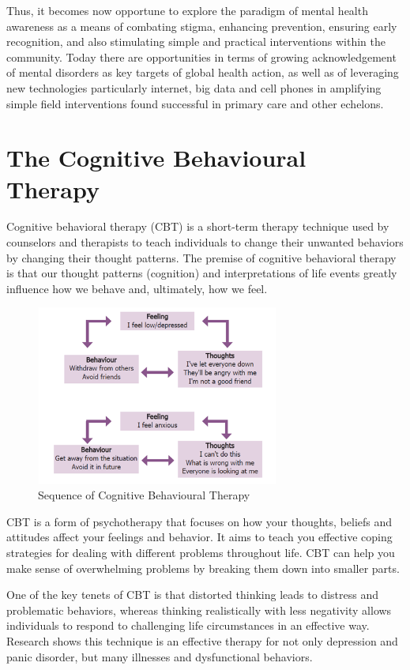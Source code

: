 Thus, it becomes now opportune to explore the paradigm of mental health awareness as a means of combating stigma, enhancing prevention, ensuring early recognition, and also stimulating simple and practical interventions within the community. Today there are opportunities in terms of growing acknowledgement of mental disorders as key targets of global health action, as well as of leveraging new technologies particularly internet, big data and cell phones in amplifying simple field interventions found successful in primary care and other echelons.

\pagebreak

\section{The Cognitive Behavioural Therapy}

Cognitive behavioral therapy (CBT) is a short-term therapy technique used by counselors and therapists to teach individuals to change their unwanted behaviors by changing their thought patterns. The premise of cognitive behavioral therapy is that our thought patterns (cognition) and interpretations of life events greatly influence how we behave and, ultimately, how we feel.

\begin{figure}[H]
    \centering
    \includegraphics[width=8cm]{images/cbt-diagram.jpg}
    \caption{Sequence of Cognitive Behavioural Therapy}
    \label{fig:cbt-diagram}
\end{figure}

CBT is a form of psychotherapy that focuses on how your thoughts, beliefs and attitudes affect your feelings and behavior. It aims to teach you effective coping strategies for dealing with different problems throughout life. CBT can help you make sense of overwhelming problems by breaking them down into smaller parts.

One of the key tenets of CBT is that distorted thinking leads to distress and problematic behaviors, whereas thinking realistically with less negativity allows individuals to respond to challenging life circumstances in an effective way. Research shows this technique is an effective therapy for not only depression and panic disorder, but many illnesses and dysfunctional behaviors.

